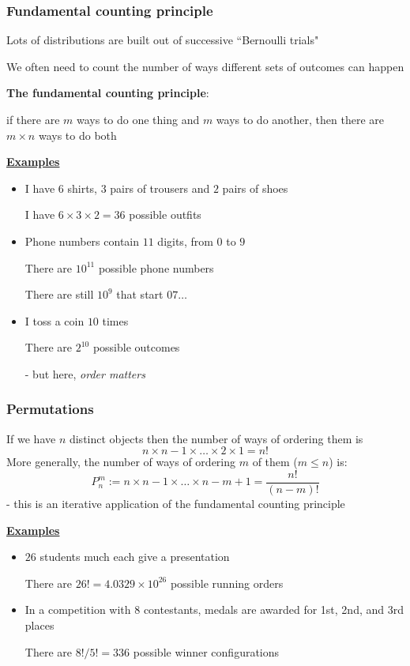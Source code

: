 \documentclass[t,8pt]{beamer}%
\begin{document}
    \begin{frame}
		\frametitle{Fundamental counting principle}
		Lots of distributions are built out of successive ``Bernoulli trials" \par
            We often need to count the number of ways different sets of outcomes can happen \par
            {\bf The fundamental counting principle}: \par
            if there are $m$ ways to do one thing and $m$ ways to do another, then there are $m\times n$ ways to do both \par
            {\bf\underline{Examples}}
            \begin{itemize}
                \item I have $6$ shirts, $3$ pairs of trousers and $2$ pairs of shoes \par
                I have $6\times 3\times 2=36$ possible outfits
                \item Phone numbers contain $11$ digits, from $0$ to $9$ \par
                There are $10^{11}$ possible phone numbers \par
                There are still $10^9$ that start $07\dots$
                \item I toss a coin $10$ times \par
                There are $2^{10}$ possible outcomes \par
                - but here, {\it order matters}
            \end{itemize}
	\end{frame}

    \begin{frame}
	\frametitle{Permutations}
	If we have $n$ distinct objects then the number of ways of ordering them is
        $$n\times n-1\times\dots\times 2\times 1=n!$$
        More generally, the number of ways of ordering $m$ of them ($m\leq n$) is:
        $$P_n^m:=n\times n-1\times\dots\times n-m+1=\frac{n!}{(n-m)!}$$ 
        {\small\color{NavyBlue} - this is an iterative application of the fundamental counting principle} \par
        {\bf\underline{Examples}}
    \begin{itemize}
                \item $26$ students much each give a presentation \par
                There are $26!=4.0329\times 10^{26}$ possible running orders
                \item In a competition with 8 contestants, medals are awarded for 1st, 2nd, and 3rd places \par
                There are $8!/5!=336$ possible winner configurations
            \end{itemize}
    \end{frame}
\end{document}
